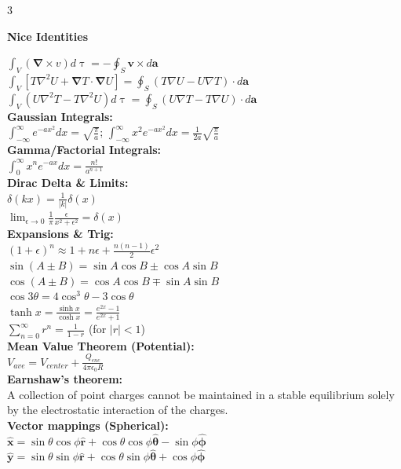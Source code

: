 \documentclass[a4paper,twoside]{article}
\newcommand{\secblock}[1]{%
\par\vspace{3pt}%
\noindent\colorbox{hdrcol}{\parbox[c][1.1em][c]{0.98\linewidth}{\color{white}\bfseries\small #1}}\par
\vspace{2pt}%
}
\begin{document}
\begin{multicols*}{3}
\secblock{Nice Identities}
\(\int_V (\bm \nabla \times v) d \uptau = - \oint_S \bm v \times d \bm a\)\\
\(\int_V [T \nabla^2 U + \bm \nabla T \cdot \bm \nabla U] = \oint_S (T \nabla U - U \nabla T) \cdot d \bm a\)\\
\(\int_V (U \nabla^2 T - T \nabla^2 U) d \uptau = \oint_S (U \nabla T - T \nabla U) \cdot d \bm a\)\\
\textbf{Gaussian Integrals:}\\
\(\int_{-\infty}^{\infty} e^{-ax^2} dx = \sqrt{\frac{\pi}{a}}\); \(\int_{-\infty}^{\infty} x^2 e^{-ax^2} dx = \frac{1}{2a}\sqrt{\frac{\pi}{a}}\)\\
\textbf{Gamma/Factorial Integrals:}\\
\(\int_0^\infty x^n e^{-ax} dx = \frac{n!}{a^{n+1}}\)\\
\textbf{Dirac Delta \& Limits:}\\
\(\delta(kx) = \frac{1}{|k|}\delta(x)\)\\
\(\lim_{\epsilon \to 0} \frac{1}{\pi} \frac{\epsilon}{x^2 + \epsilon^2} = \delta(x)\)\\
\textbf{Expansions \& Trig:}\\
\((1+\epsilon)^n \approx 1 + n\epsilon + \frac{n(n-1)}{2}\epsilon^2\)\\
\(\sin(A \pm B) = \sin A \cos B \pm \cos A \sin B\)\\
\(\cos(A \pm B) = \cos A \cos B \mp \sin A \sin B\)\\
\(\cos 3 \theta = 4 \cos^3 \theta - 3 \cos \theta\)\\
\(\tanh x = \frac{\sinh x}{\cosh x} = \frac{e^{2x} -1}{e^{2x} + 1}\)\\
\(\sum_{n=0}^{\infty} r^n = \frac{1}{1-r}\) (for \(|r|<1\))\\
\textbf{Mean Value Theorem (Potential):}\\
\(V_{ave} = V_{center} + \frac{Q_{enc}}{4\pi\epsilon_0 R}\)\\
\textbf{Earnshaw's theorem:}\\
A collection of point charges cannot be maintained in a stable equilibrium solely by the electrostatic interaction of the charges.\\
\textbf{Vector mappings (Spherical):}\\
\(\hat{\bm x} = \sin \theta \cos \phi \hat{\bm r} + \cos \theta \cos \phi \hat{\bm \theta}-\sin \phi \hat{\bm \phi}\)\\
\(\hat{\bm y} = \sin\theta \sin \phi \hat{\bm r} + \cos\theta \sin \phi \hat{\bm \theta} + \cos \phi \hat{\bm \phi}\)\\

\end{multicols*}
\end{document}

